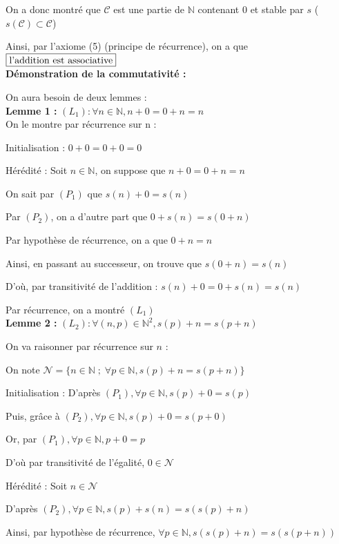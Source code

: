 \documentclass{article}
\begin{document}
On a donc montré que $\mathcal{C}$ est une partie de $\mathbb{N}$ contenant $0$ et stable par $s$ ($s(\mathcal{C}) \subset \mathcal{C}$)

Ainsi, par l'axiome (5) (principe de récurrence), on a que $\boxed{\textup{l'addition est associative}}$
\\

\textbf{Démonstration de la commutativité :}

On aura besoin de deux lemmes :
\\

\textbf{Lemme 1 :} $(L_1) : \forall n \in \mathbb{N}, n + 0 = 0+n = n$
\\

On le montre par récurrence sur n : 

Initialisation : $0+0 = 0+0 = 0$

Hérédité : Soit $n \in \mathbb{N}$, on suppose que $n + 0 = 0+n = n$

On sait par $(P_1)$ que $s(n) + 0 = s(n)$

Par $(P_2)$, on a d'autre part que $0 + s(n) = s(0+n)$

Par hypothèse de récurrence, on a que $0 + n = n$

Ainsi, en passant au successeur, on trouve que $s(0+n) = s(n)$

D'où, par transitivité de l'addition : $s(n) + 0 = 0 + s(n) = s(n)$

Par récurrence, on a montré $(L_1)$
\\

\textbf{Lemme 2 :} $(L_2) : \forall (n,p) \in \mathbb{N}^2, s(p) + n = s(p+n)$

On va raisonner par récurrence sur $n$ :

On note $\mathcal{N} = \{ n \in \mathbb{N} \; ; \; \forall p \in \mathbb{N}, s(p) + n = s(p+n) \}$

Initialisation : D'après $(P_1), \forall p \in \mathbb{N}, s(p) + 0 = s(p)$ 

Puis, grâce à $(P_2), \forall p \in \mathbb{N}, s(p) + 0 = s(p+0)$

Or, par $(P_1), \forall p \in \mathbb{N}, p+0=p$

D'où par transitivité de l'égalité, $0 \in \mathcal{N}$

Hérédité : Soit $n \in \mathcal{N}$

D'après $(P_2), \forall p \in \mathbb{N}, s(p) + s(n) = s(s(p) + n)$

Ainsi, par hypothèse de récurrence, $\forall p \in \mathbb{N}, s(s(p)+n) = s(s(p+n))$
\end{document}

